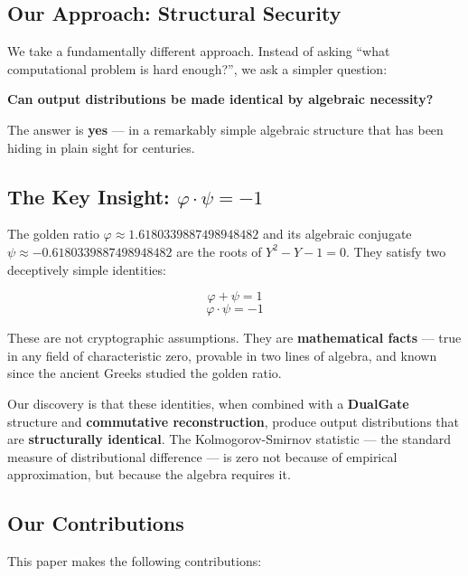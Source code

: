 \documentclass[11pt,a4paper]{article}
\begin{document}
\subsection{Our Approach: Structural Security}

We take a fundamentally different approach. Instead of asking ``what computational problem is hard enough?'', we ask a simpler question:

\begin{center}
\textbf{Can output distributions be made identical by algebraic necessity?}
\end{center}

The answer is \textbf{yes} — in a remarkably simple algebraic structure that has been hiding in plain sight for centuries.

\subsection{The Key Insight: $\varphi \cdot \psi = -1$}

The golden ratio $\varphi \approx 1.6180339887498948482$ and its algebraic conjugate $\psi \approx -0.6180339887498948482$ are the roots of $Y^2 - Y - 1 = 0$. They satisfy two deceptively simple identities:

\begin{equation}
\varphi + \psi = 1 \label{eq:sum}
\end{equation}
\begin{equation}
\varphi \cdot \psi = -1 \label{eq:product}
\end{equation}

These are not cryptographic assumptions. They are \textbf{mathematical facts} — true in any field of characteristic zero, provable in two lines of algebra, and known since the ancient Greeks studied the golden ratio.

Our discovery is that these identities, when combined with a \textbf{DualGate} structure and \textbf{commutative reconstruction}, produce output distributions that are \textbf{structurally identical}. The Kolmogorov-Smirnov statistic — the standard measure of distributional difference — is zero not because of empirical approximation, but because the algebra requires it.

\subsection{Our Contributions}

This paper makes the following contributions:
\end{document}
